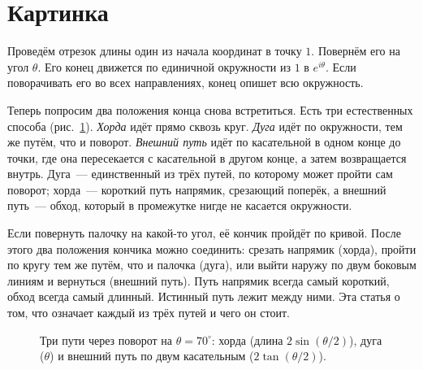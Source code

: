 \section{Картинка}\label{sec:picture}

Проведём отрезок длины один из начала координат в точку $1$. Повернём его на угол
$\theta$. Его конец движется по единичной окружности из $1$ в $e^{i\theta}$. Если
поворачивать его во всех направлениях, конец опишет всю окружность.

Теперь попросим два положения конца снова встретиться. Есть три естественных способа
(рис.~\ref{fig:three}). \emph{Хорда} идёт прямо сквозь круг. \emph{Дуга} идёт по
окружности, тем же путём, что и поворот. \emph{Внешний путь} идёт по касательной в одном
конце до точки, где она пересекается с касательной в другом конце, а затем возвращается
внутрь. Дуга~--- единственный из трёх путей, по которому может пройти сам поворот; хорда~---
короткий путь напрямик, срезающий поперёк, а внешний путь~--- обход, который в промежутке
нигде не касается окружности.

\begin{plain}
Если повернуть палочку на какой-то угол, её кончик пройдёт по кривой. После этого два
положения кончика можно соединить: срезать напрямик (хорда), пройти по кругу тем же путём,
что и палочка (дуга), или выйти наружу по двум боковым линиям и вернуться (внешний путь).
Путь напрямик всегда самый короткий, обход всегда самый длинный. Истинный путь лежит между ними.
Эта статья о том, что означает каждый из трёх путей и чего он стоит.
\end{plain}

\begin{figure}[t]\centering
{}
\caption{Три пути через поворот на $\theta=70^\circ$: хорда (длина $2\sin(\theta/2)$),
дуга ($\theta$) и внешний путь по двум касательным ($2\tan(\theta/2)$).}
\label{fig:three}
\end{figure}

